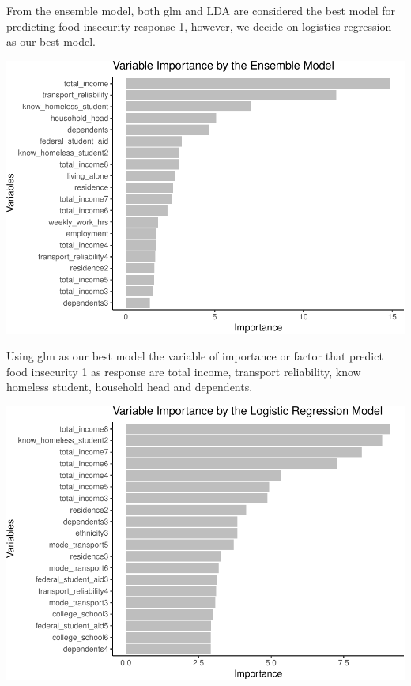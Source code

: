 \documentclass[
  10pt,
]{article}
\begin{document}
From the ensemble model, both glm and LDA are considered the best model for predicting food insecurity response 1, however, we decide on logistics regression as our best model.\\

\begin{center}\includegraphics{final_phase2_report_files/figure-latex/unnamed-chunk-19-1} \end{center}

Using glm as our best model the variable of importance or factor that predict food insecurity 1 as response are total income, transport reliability, know homeless student, household head and dependents.\\

\begin{center}\includegraphics{final_phase2_report_files/figure-latex/unnamed-chunk-20-1} \end{center}
\end{document}
